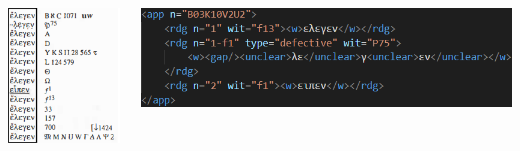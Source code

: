 \documentclass[10pt]{beamer}
\begin{document}
	\begin{frame}
		\begin{columns}
			\begin{column}{0.25\textwidth}
				\includegraphics[width=\textwidth]{../img/swanson-luke-10-2-2.png}
			\end{column}
			\begin{column}{0.65\textwidth}
				\includegraphics[width=\textwidth]{../img/app-xml.png}
			\end{column}
		\end{columns}
	\end{frame}
\end{document}
